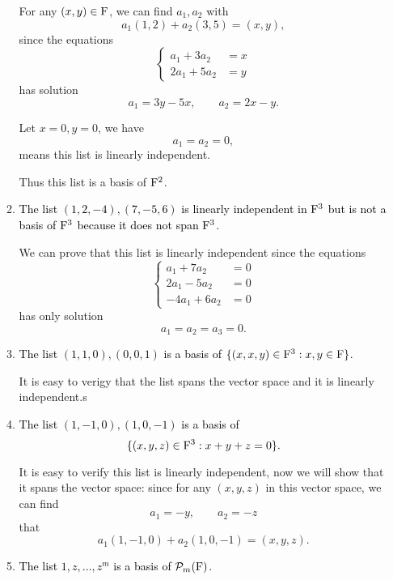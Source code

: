 \begin{enumerate}
\begin{solution}
\begin{enumerate}[label=(\alph*)]
                    For any $(x,y) \in \mathrm{F}$, we can find $a_1, a_2$ with 
                    \[ a_1(1,2) + a_2(3,5) = (x,y),\]
                    since the equations 
                    \[
                        \begin{cases}
                            a_1 + 3a_2 &= x \\
                            2a_1 + 5a_2 &=y 
                        \end{cases}
                    \]
                    has solution 
                    \[ a_1 = 3y-5x, \qquad a_2=2x-y.\]

                    Let $x=0,y=0$, we have 
                    \[ a_1 = a_2 = 0,\]
                    means this list is linearly independent.

                    Thus this list is a basis of $\mathrm{F}^2$.
                \item \textcolor{black}{The list $(1,2,-4), (7,-5,6)$ is linearly independent in $\mathrm{F}^3$ but is not a basis of $\mathrm{F}^3$ because it does not span $\mathrm{F}^3$.}
                
                    We can prove that this list is linearly independent since the equations
                    \[ 
                        \begin{cases}
                            a_1 + 7a_2 &= 0 \\
                            2a_1 - 5a_2 &= 0\\
                            -4a_1 + 6a_2 &= 0
                        \end{cases}
                    \]
                    has only solution 
                    \[ a_1 = a_2 = a_3 = 0.\]

                \item \textcolor{black}{The list $(1,1,0),(0,0,1)$ is a basis of $\{(x,x,y)\in \mathrm{F}^3: x,y \in \mathrm{F}\}$.}
                
                        It is easy to verigy that the list spans the vector space and it is linearly independent.s
                \item \textcolor{black}{The list $(1,-1,0),(1,0,-1)$ is a basis of \[\{(x,y,z)\in \mathrm{F}^3:x+y+z=0\}.\]}

                        It is easy to verify this list is linearly independent, now we will show that it spans the vector space:
                        since for any $(x,y,z)$ in this vector space, we can find 
                        \[ a_1 = -y,\qquad a_2 = -z\]
                        that 
                        \[ a_1(1,-1,0) + a_2(1,0,-1) = (x,y,z).\]
                \item \textcolor{black}{The list $1, z, \ldots, z^m$ is a basis of $\mathcal{P}_m(\mathrm{F})$.}
                

\end{enumerate}
\end{solution}
\end{enumerate}
